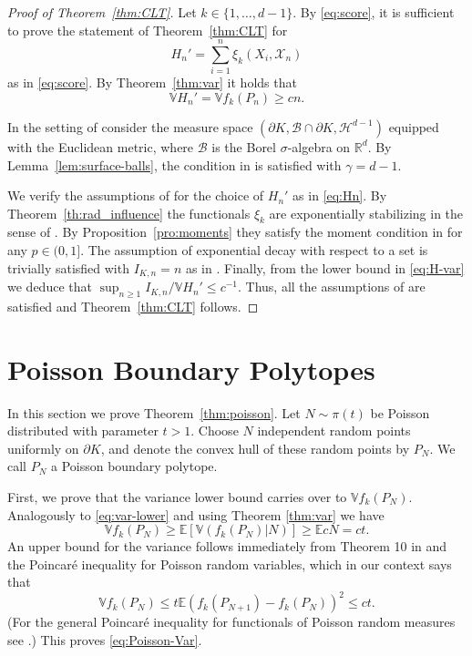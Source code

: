 \documentclass[12pt]{article}
\newcommand{\IR}{\mathds{R}}
\def\E{{\mathds E}}
\def\V{{\mathds V}}
\def\cB{{\mathcal B}}
\def\cH{{\mathcal H}}
\def\cX{{\mathcal X}}
\def\bd{{\partial}}
\theoremstyle{definition}
\begin{document}
\begin{proof}[Proof of Theorem~\ref{thm:CLT}]
	Let $k\in \{1,\dots,d-1\}$. By \eqref{eq:score}, it is sufficient to prove the statement of Theorem~\ref{thm:CLT} for 
\begin{equation} \label{eq:Hn}
H_n'
=\sum_{i=1}^{n}\xi_k(X_i,\cX_n)
\end{equation}
as in \eqref{eq:score}. By Theorem~\ref{thm:var} it holds that
\begin{equation} \label{eq:H-var}
\V H_n'
=\V f_k(P_n)
\ge c n.
\end{equation}

In the setting of \cite{LachSchulteYukich} consider the measure space $(\partial K,\cB\cap \bd K,\cH^{d-1})$ equipped with the Euclidean metric, where $\cB$ is the Borel $\sigma$-algebra on $\IR^d$. By Lemma~\ref{lem:surface-balls}, the condition in \cite[eq.~(2.1)]{LachSchulteYukich} is satisfied with $\gamma=d-1$. 

We verify the assumptions of \cite[Corollary 2.2(b)]{LachSchulteYukich} for the choice of $H_n'$ as in \eqref{eq:Hn}. By Theorem~\ref{th:rad_influence} the functionals $\xi_k$ are exponentially stabilizing in the sense of \cite{LachSchulteYukich}. By Proposition~\ref{pro:moments} they satisfy the moment condition in \cite[Theorem~2.1(b)]{LachSchulteYukich} for any $p\in (0,1]$. The assumption of exponential decay with respect to a set is trivially satisfied with $I_{K,n}=n$ as in \cite[eq.~(2.13)]{LachSchulteYukich}. Finally, from the lower bound in \eqref{eq:H-var} we deduce that $\sup_{n\ge 1}I_{K,n}/\V H_n' \le c^{-1}$. Thus, all the assumptions of \cite[Corollary 2.2(b)]{LachSchulteYukich} are satisfied and Theorem~\ref{thm:CLT} follows. 
\end{proof}
\section{Poisson Boundary Polytopes}\label{sec:poisson}

In this section we prove Theorem~\ref{thm:poisson}. Let $N \sim \pi(t)$ be Poisson distributed with parameter $t>1$. Choose $N$ independent random points uniformly on $\bd K$, and denote the convex hull of these random points by $P_N$. We call $P_N$ a Poisson boundary polytope. 

First, we prove that the variance lower bound carries over to $\V f_k(P_N)$. Analogously to \eqref{eq:var-lower} and using Theorem \ref{thm:var} we have
$$
\V f_k(P_N) \geq \E[\V ( f_k (P_N)|N)] \geq \E c N = c t.
$$
An upper bound for the variance follows immediately from Theorem 10 in \cite{Re03} and the Poincar\'e inequality for Poisson random variables, which in our context says that
$$
\V f_k(P_N) \leq t \E (f_k(P_{N+1})-f_k(P_N))^2 \leq c t. 
$$
(For the general Poincar\'e inequality for functionals of Poisson random measures see \cite[Theorem 18.7]{LP}.) This proves \eqref{eq:Poisson-Var}.
\end{document}
